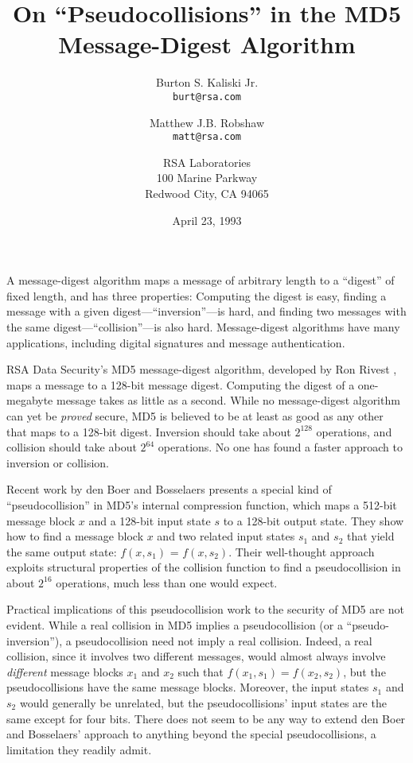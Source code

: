 

\title{On ``Pseudocollisions'' in the MD5 Message-Digest Algorithm}
\author{Burton S. Kaliski Jr. \\
{\tt burt@rsa.com} \and
Matthew J.B. Robshaw \\
{\tt matt@rsa.com} \and
RSA Laboratories \\
100 Marine Parkway \\
Redwood City, CA  94065}
\date{April 23, 1993}

\maketitle

A message-digest algorithm maps a message of arbitrary length to a
``digest'' of fixed length, and has three properties: Computing the
digest is easy, finding a message with a given
digest---``inversion''---is hard, and finding two messages with the
same digest---``collision''---is also hard. Message-digest algorithms
have many applications, including digital signatures and message
authentication.

RSA Data Security's MD5 message-digest algorithm, developed by Ron
Rivest \cite{rfc-md5}, maps a message to a 128-bit message digest.
Computing the digest of a one-megabyte message takes as little as a
second.  While no message-digest algorithm can yet be {\em proved}
secure, MD5 is believed to be at least as good as any other that maps
to a 128-bit digest.  Inversion should take about $2^{128}$
operations, and collision should take about $2^{64}$ operations.  No
one has found a faster approach to inversion or collision.

Recent work by den Boer and Bosselaers \cite{den-boer-md5} presents
a special kind of ``pseudocollision'' in MD5's
internal compression function, which maps
a 512-bit message block $x$ and a
128-bit input state $s$ to a 128-bit output
state. They show how to find a message block $x$
and two related input states $s_1$ and $s_2$ that yield the same
output state: $f(x,s_1)$ = $f(x,s_2)$. Their well-thought approach
exploits structural properties of the collision function to find 
a pseudocollision in about $2^{16}$ operations, much less than one
would expect.

Practical implications of this pseudocollision work to the security of
MD5 are not evident. While a real collision in MD5 implies a
pseudocollision (or a ``pseudo-inversion''), a
pseudocollision need not imply a real collision. Indeed, a real
collision, since it involves two different messages, would almost
always involve {\em different} message blocks $x_1$ and $x_2$ such that
$f(x_1,s_1) = f(x_2,s_2)$, but the pseudocollisions have the same
message blocks. Moreover, the input states $s_1$ and $s_2$ would
generally be unrelated, but the pseudocollisions' input states are
the same except for four bits.  There does not seem to be any way to
extend den Boer and Bosselaers' approach to anything beyond the
special pseudocollisions, a limitation they readily admit.

